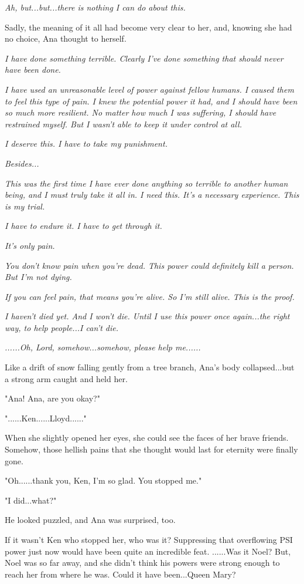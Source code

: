 \documentclass[
]{article}
\begin{document}
\emph{Ah, but...but...there is nothing I can do about this.}

Sadly, the meaning of it all had become very clear to her, and, knowing
she had no choice, Ana thought to herself.

\emph{I have done something terrible. Clearly I've done something that
should never have been done.}

\emph{I have used an unreasonable level of power against fellow humans.
I caused them to feel this type of pain. I knew the potential power it
had, and I should have been so much more resilient. No matter how much I
was suffering, I should have restrained myself. But I wasn't able to
keep it under control at all.}

\emph{I deserve this. I have to take my punishment.}

\emph{Besides...}

\emph{This was the first time I have ever done anything so terrible to
another human being, and I must truly take it all in. I need this. It's
a necessary experience. This is my trial.}

\emph{I have to endure it. I have to get through it.}

\emph{It's only pain.}

\emph{You don't know pain when you're dead. This power could definitely
kill a person. But I'm not dying.}

\emph{If you can feel pain, that means you're alive. So I'm still alive.
This is the proof.}

\emph{I haven't died yet. And I won't die. Until I use this power once
again...the right way, to help people...I can't die.}

\emph{......Oh, Lord, somehow...somehow, please help me......}

Like a drift of snow falling gently from a tree branch, Ana's body
collapsed...but a strong arm caught and held her.

"Ana! Ana, are you okay?"

"......Ken......Lloyd......"

When she slightly opened her eyes, she could see the faces of her brave
friends. Somehow, those hellish pains that she thought would last for
eternity were finally gone.

"Oh......thank you, Ken, I'm so glad. You stopped me."

"I did...what?"

He looked puzzled, and Ana was surprised, too.

If it wasn't Ken who stopped her, who was it? Suppressing that
overflowing PSI power just now would have been quite an incredible feat.
......Was it Noel? But, Noel was so far away, and she didn't think his
powers were strong enough to reach her from where he was. Could it have
been...Queen Mary?
\end{document}
